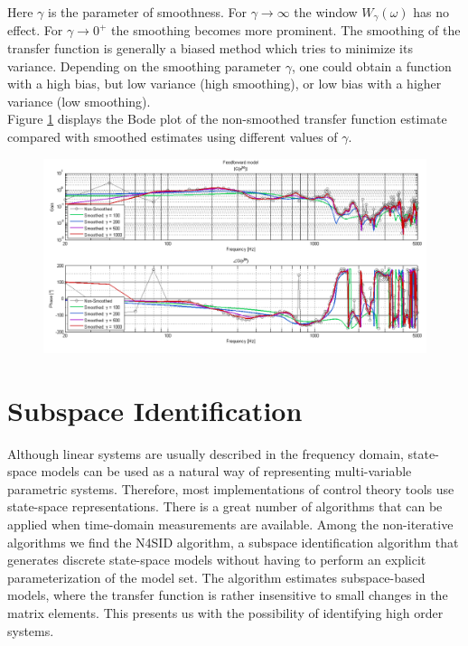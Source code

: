 Here $\gamma$ is the parameter of smoothness. For $\gamma \rightarrow \infty$ the window $W_\gamma(\omega)$ has no effect. For $\gamma \rightarrow 0^+$ the smoothing becomes more prominent. The smoothing of the transfer function is generally a biased method which tries to minimize its variance. Depending on the smoothing parameter $\gamma$, one could obtain a function with a high bias, but low variance (high smoothing), or low bias with a higher variance (low smoothing). \\

Figure \ref{} displays the Bode plot of the non-smoothed transfer function estimate compared with smoothed estimates using different values of $\gamma$.


\begin{figure}[h]
\centering
\includegraphics[width=1.0\textwidth]{pics/FF_Smoothing}
\caption{}
\label{pic:}
\end{figure}



\section{Subspace Identification}

Although linear systems are usually described in the frequency domain, state-space models can be used as a natural way of representing multi-variable parametric systems. Therefore, most implementations of control theory tools use state-space representations. There is a great number of algorithms that can be applied when time-domain measurements are available. Among the non-iterative algorithms we find the N4SID algorithm, a subspace identification algorithm that generates discrete state-space models without having to perform an explicit parameterization of the model set. The algorithm estimates subspace-based models, where the transfer function is rather insensitive to small changes in the matrix elements. This presents us with the possibility of identifying high order systems. \\

